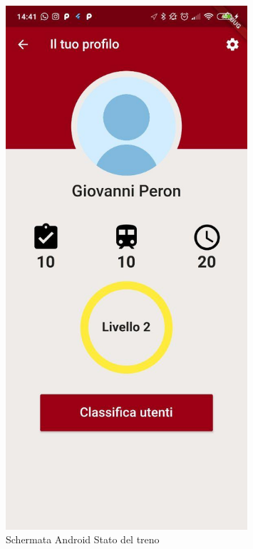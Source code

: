 \begin{minipage}{0.45\textwidth}
	\begin{figure}[H]
		\centering
		\includegraphics[width=0.8\textwidth]{immagini/profile.jpg}
		\caption{Schermata Android Stato del treno}
	\end{figure}
\end{minipage}
\hfill
